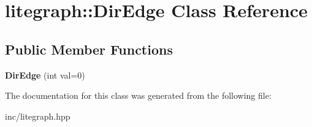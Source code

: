 \hypertarget{classlitegraph_1_1DirEdge}{}\section{litegraph\+:\+:Dir\+Edge Class Reference}
\label{classlitegraph_1_1DirEdge}
\subsection*{Public Member Functions}
\begin{DoxyCompactItemize}
\item 
\mbox{\label{classlitegraph_1_1DirEdge_a2fbdc20c37b174c1d5cbc5d12f197343}} 
{\bfseries Dir\+Edge} (int val=0)
\end{DoxyCompactItemize}


The documentation for this class was generated from the following file\+:\begin{DoxyCompactItemize}
\item 
inc/litegraph.\+hpp\end{DoxyCompactItemize}
